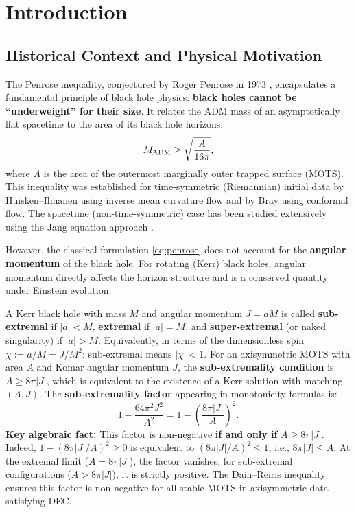 \section{Introduction}

\subsection{Historical Context and Physical Motivation}

The Penrose inequality, conjectured by Roger Penrose in 1973 \cite{penrose1973}, encapsulates a fundamental principle of black hole physics: \textbf{black holes cannot be ``underweight'' for their size}. It relates the ADM mass of an asymptotically flat spacetime to the area of its black hole horizons:
\begin{equation}\label{eq:penrose}
    M_{\mathrm{ADM}} \geq \sqrt{\frac{A}{16\pi}},
\end{equation}
where $A$ is the area of the outermost marginally outer trapped surface (MOTS). This inequality was established for time-symmetric (Riemannian) initial data by Huisken--Ilmanen \cite{huisken2001} using inverse mean curvature flow and by Bray \cite{bray2001} using conformal flow. The spacetime (non-time-symmetric) case has been studied extensively using the Jang equation approach \cite{braykhuri2010, hankhuri2013}.

However, the classical formulation \eqref{eq:penrose} does not account for the \textbf{angular momentum} of the black hole. For rotating (Kerr) black holes, angular momentum directly affects the horizon structure and is a conserved quantity under Einstein evolution.

\begin{definition}\label{def:sub-extremal}
A Kerr black hole with mass $M$ and angular momentum $J = aM$ is called \textbf{sub-extremal} if $|a| < M$, \textbf{extremal} if $|a| = M$, and \textbf{super-extremal} (or naked singularity) if $|a| > M$. Equivalently, in terms of the dimensionless spin $\chi := a/M = J/M^2$: sub-extremal means $|\chi| < 1$. For an axisymmetric MOTS with area $A$ and Komar angular momentum $J$, the \textbf{sub-extremality condition} is $A \geq 8\pi|J|$, which is equivalent to the existence of a Kerr solution with matching $(A, J)$. The \textbf{sub-extremality factor} appearing in monotonicity formulas is:
\[
1 - \frac{64\pi^2 J^2}{A^2} = 1 - \left(\frac{8\pi|J|}{A}\right)^2.
\]
\textbf{Key algebraic fact:} This factor is non-negative \textbf{if and only if} $A \geq 8\pi|J|$. Indeed, $1 - (8\pi|J|/A)^2 \geq 0$ is equivalent to $(8\pi|J|/A)^2 \leq 1$, i.e., $8\pi|J| \leq A$. At the extremal limit ($A = 8\pi|J|$), the factor vanishes; for sub-extremal configurations ($A > 8\pi|J|$), it is strictly positive. The Dain--Reiris inequality \cite{dain2011} ensures this factor is non-negative for all stable MOTS in axisymmetric data satisfying DEC.
\end{definition}

